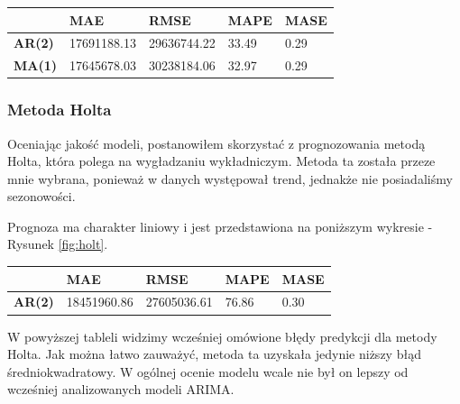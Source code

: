 \documentclass[11pt]{article}
\begin{document}
\begin{center}
\begin{tabular}{l|l|l|l|l|}
\cline{2-5}
                                     & \textbf{MAE} & \textbf{RMSE} & \textbf{MAPE} & \textbf{MASE} \\ \hline
\multicolumn{1}{|l|}{\textbf{AR(2)}} & 17691188.13  & 29636744.22   & 33.49         & 0.29          \\ \hline
\multicolumn{1}{|l|}{\textbf{MA(1)}} & 17645678.03  & 30238184.06   & 32.97         & 0.29          \\ \hline
\end{tabular}
\label{tab:tabela}
\end{center}

\subsubsection{Metoda Holta}

Oceniając jakość modeli, postanowiłem skorzystać z prognozowania metodą Holta, która polega na wygładzaniu wykładniczym. Metoda ta została przeze mnie wybrana, ponieważ w danych występował trend, jednakże nie posiadaliśmy sezonowości.

Prognoza ma charakter liniowy i jest przedstawiona na poniższym wykresie - Rysunek \ref{fig:holt}.


\begin{center}
\begin{tabular}{l|l|l|l|l|}
\cline{2-5}
                                     & \textbf{MAE} & \textbf{RMSE} & \textbf{MAPE} & \textbf{MASE} \\ \hline
\multicolumn{1}{|l|}{\textbf{AR(2)}} & 18451960.86  & 27605036.61   & 76.86         & 0.30          \\ \hline
\end{tabular}
\label{tab:tabela2}
\end{center}

W powyższej tableli widzimy wcześniej omówione błędy predykcji dla metody Holta. Jak można łatwo zauważyć, metoda ta uzyskała jedynie niższy błąd średniokwadratowy. W ogólnej ocenie modelu wcale nie był on lepszy od wcześniej analizowanych modeli ARIMA.

\clearpage
\end{document}
